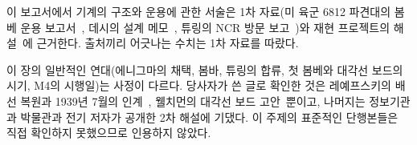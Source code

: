 이 보고서에서 기계의 구조와 운용에 관한 서술은 1차 자료(미 육군 6812 파견대의 봄베 운용
보고서~\cite{us6812report1944}, 데시의 설계 메모~\cite{desch1942memo}, 튜링의 NCR 방문
보고~\cite{turing1942ncr})와 재현 프로젝트의 해설~\cite{jackson-bh10,ellsbury1998bombe,carter2010bombe}에
근거한다. 출처끼리 어긋나는 수치는 1차 자료를 따랐다.

이 장의 일반적인 연대(에니그마의 채택, 봄바, 튜링의 합류, 첫 봄베와 대각선 보드의 시기, M4의 시행일)는
사정이 다르다. 당사자가 쓴 글로 확인한 것은 레예프스키의 배선 복원과 1939년 7월의
인계~\cite{rejewski1980application}, 웰치먼의 대각선 보드 고안~\cite{welchman1986bomba}뿐이고, 나머지는
정보기관과 박물관과 전기 저자가 공개한 2차 해설에 기댔다. 이 주제의 표준적인 단행본들은 직접 확인하지
못했으므로 인용하지 않았다.
